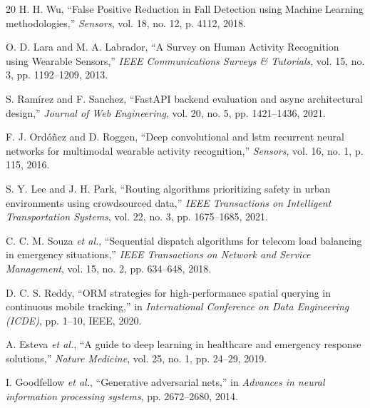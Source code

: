 \documentclass[10pt,journal,compsoc]{IEEEtran}
\begin{document}
\begin{thebibliography}{20}
H. H. Wu, ``False Positive Reduction in Fall Detection using Machine Learning methodologies,'' \emph{Sensors}, vol. 18, no. 12, p. 4112, 2018.

O. D. Lara and M. A. Labrador, ``A Survey on Human Activity Recognition using Wearable Sensors,'' \emph{IEEE Communications Surveys \& Tutorials}, vol. 15, no. 3, pp. 1192--1209, 2013.

S. Ram{\'i}rez and F. Sanchez, ``FastAPI backend evaluation and async architectural design,'' \emph{Journal of Web Engineering}, vol. 20, no. 5, pp. 1421--1436, 2021.

F. J. Ord{\'o}{\~n}ez and D. Roggen, ``Deep convolutional and lstm recurrent neural networks for multimodal wearable activity recognition,'' \emph{Sensors}, vol. 16, no. 1, p. 115, 2016.

S. Y. Lee and J. H. Park, ``Routing algorithms prioritizing safety in urban environments using crowdsourced data,'' \emph{IEEE Transactions on Intelligent Transportation Systems}, vol. 22, no. 3, pp. 1675--1685, 2021.

C. C. M. Souza \emph{et al.}, ``Sequential dispatch algorithms for telecom load balancing in emergency situations,'' \emph{IEEE Transactions on Network and Service Management}, vol. 15, no. 2, pp. 634--648, 2018.

D. C. S. Reddy, ``ORM strategies for high-performance spatial querying in continuous mobile tracking,'' in \emph{International Conference on Data Engineering (ICDE)}, pp. 1--10, IEEE, 2020.

A. Esteva \emph{et al.}, ``A guide to deep learning in healthcare and emergency response solutions,'' \emph{Nature Medicine}, vol. 25, no. 1, pp. 24--29, 2019.

I. Goodfellow \emph{et al.}, ``Generative adversarial nets,'' in \emph{Advances in neural information processing systems}, pp. 2672--2680, 2014.

\end{thebibliography}
\end{document}
